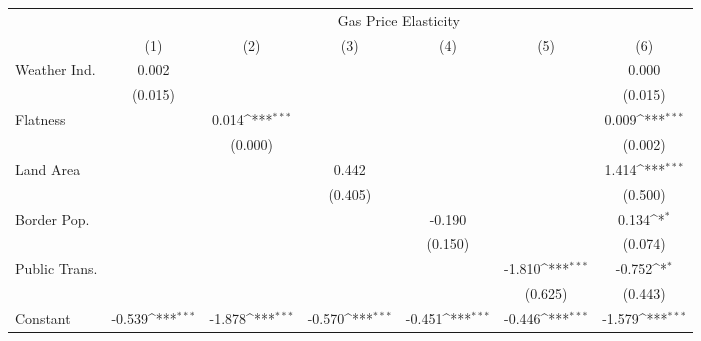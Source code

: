 {
\def\sym#1{\ifmmode^{#1}\else\(^{#1}\)\fi}
\begin{tabular}{l*{6}{c}}
\hline\hline
            &\multicolumn{6}{c}{Gas Price Elasticity}                                                                                           \\
            &\multicolumn{1}{c}{(1)}         &\multicolumn{1}{c}{(2)}         &\multicolumn{1}{c}{(3)}         &\multicolumn{1}{c}{(4)}         &\multicolumn{1}{c}{(5)}         &\multicolumn{1}{c}{(6)}         \\
\hline
Weather Ind.&       0.002         &                     &                     &                     &                     &       0.000         \\
            &     (0.015)         &                     &                     &                     &                     &     (0.015)         \\
[1em]
Flatness    &                     &       0.014\sym{***}&                     &                     &                     &       0.009\sym{***}\\
            &                     &     (0.000)         &                     &                     &                     &     (0.002)         \\
[1em]
Land Area   &                     &                     &       0.442         &                     &                     &       1.414\sym{***}\\
            &                     &                     &     (0.405)         &                     &                     &     (0.500)         \\
[1em]
Border Pop. &                     &                     &                     &      -0.190         &                     &       0.134\sym{*}  \\
            &                     &                     &                     &     (0.150)         &                     &     (0.074)         \\
[1em]
Public Trans.&                     &                     &                     &                     &      -1.810\sym{***}&      -0.752\sym{*}  \\
            &                     &                     &                     &                     &     (0.625)         &     (0.443)         \\
[1em]
Constant    &      -0.539\sym{***}&      -1.878\sym{***}&      -0.570\sym{***}&      -0.451\sym{***}&      -0.446\sym{***}&      -1.579\sym{***}\\

\end{tabular}}

